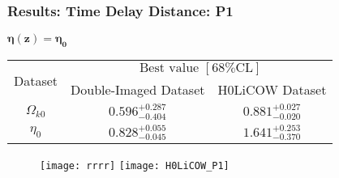 \documentclass[10pt,xcolor={dvipsnames}]{beamer}
\begin{document}
\begin{frame}
 \frametitle{Results: Time Delay Distance: P1}
\begin{small}
 
 $
{\boxed{\boldsymbol{\eta(z)=\eta_0}}}
$ 
\begin{table}
  \begin{tabular}{|c|c|c|}
    \hline
    \multirow{2}{*}{Dataset} &
      \multicolumn{2}{c|}{${\text { Best value }[68 \% \mathrm{CL}]}$} \\
\cline{2-3}
    &Double-Imaged Dataset & H0LiCOW Dataset \\
    \hline
    $\Omega_{k0}$ & $ {0.596_{-0.404}^{+0.287}}$ & $0.881^{+0.027}_{-0.020}$ \\
    \hline
    $ \eta_0$ &${0.828_{-0.045}^{+0.055}}$ &$1.641^{+0.253}_{-0.370}$  \\
       \hline
  \end{tabular}
\end{table}
\end{small}

 \begin{figure}[ht!]
\centering
\texttt{[image: rrrr]}
\texttt{[image: H0LiCOW\_P1]}
\end{figure} 
\end{frame}
\end{document}
